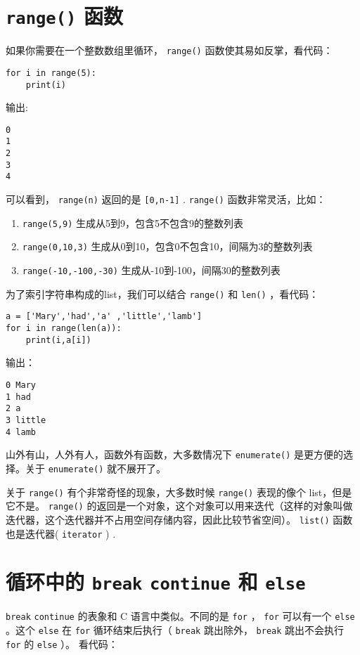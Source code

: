 \documentclass[10pt,a4paper,UTF8]{article}
\begin{document}
\section{\texttt{range()} 函数}
\label{sec:org5ec42e7}


如果你需要在一个整数数组里循环， \texttt{range()} 函数使其易如反掌，看代码：
\lstset{language=Python,label= ,caption= ,captionpos=b,numbers=none}
\begin{lstlisting}
for i in range(5):
    print(i)
\end{lstlisting}

输出:
\begin{verbatim}
0
1
2
3
4
\end{verbatim}
可以看到， \texttt{range(n)} 返回的是 \texttt{[0,n-1]} .  \texttt{range()}  函数非常灵活，比如：
\begin{enumerate}
\item \texttt{range(5,9)} 生成从5到9，包含5不包含9的整数列表
\item \texttt{range(0,10,3)} 生成从0到10，包含0不包含10，间隔为3的整数列表
\item \texttt{range(-10,-100,-30)} 生成从-10到-100，间隔30的整数列表
\end{enumerate}

为了索引字符串构成的list，我们可以结合 \texttt{range()} 和 \texttt{len()} ，看代码：
\lstset{language=Python,label= ,caption= ,captionpos=b,numbers=none}
\begin{lstlisting}
a = ['Mary','had','a' ,'little','lamb']
for i in range(len(a)):
    print(i,a[i])
\end{lstlisting}
输出：
\begin{verbatim}
0 Mary
1 had
2 a
3 little
4 lamb
\end{verbatim}

山外有山，人外有人，函数外有函数，大多数情况下 \texttt{enumerate()} 是更方便的选择。关于 \texttt{enumerate()} 就不展开了。

关于 \texttt{range()} 有个非常奇怪的现象，大多数时候 \texttt{range()} 表现的像个 list，但是它不是。 \texttt{range()} 的返回是一个对象，这个对象可以用来迭代（这样的对象叫做迭代器，这个迭代器并不占用空间存储内容，因此比较节省空间）。 \texttt{list()} 函数也是迭代器( \texttt{iterator} ) .
\section{循环中的 \texttt{break} \texttt{continue} 和 \texttt{else}}
\label{sec:org60bf851}


\texttt{break} \texttt{continue} 的表象和 C 语言中类似。不同的是 \texttt{for} ， \texttt{for} 可以有一个 \texttt{else} 。这个 \texttt{else} 在 \texttt{for} 循环结束后执行（ \texttt{break} 跳出除外， \texttt{break} 跳出不会执行 \texttt{for} 的 \texttt{else} ）。 看代码：
\end{document}
